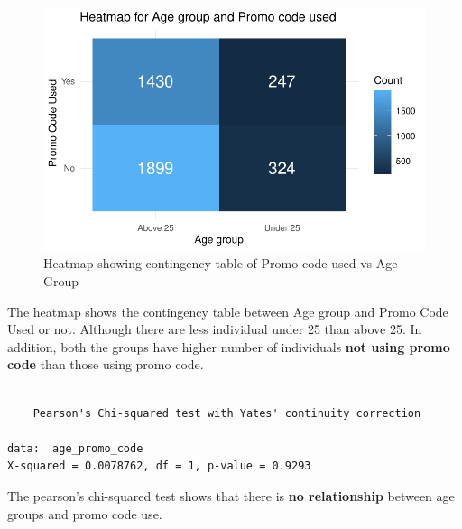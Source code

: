 \documentclass[
  letterpaper,
  DIV=11,
  numbers=noendperiod]{scrartcl}
\begin{document}
\begin{figure}[H]

{\centering \includegraphics{Customer_Preference_Analytics_files/figure-pdf/unnamed-chunk-24-1.pdf}

}

\caption{Heatmap showing contingency table of Promo code used vs Age
Group}

\end{figure}%

The heatmap shows the contingency table between Age group and Promo Code
Used or not. Although there are less individual under 25 than above 25.
In addition, both the groups have higher number of individuals
\textbf{not using promo code} than those using promo code.

\begin{verbatim}

    Pearson's Chi-squared test with Yates' continuity correction

data:  age_promo_code
X-squared = 0.0078762, df = 1, p-value = 0.9293
\end{verbatim}

The pearson's chi-squared test shows that there is \textbf{no
relationship} between age groups and promo code use.
\end{document}
